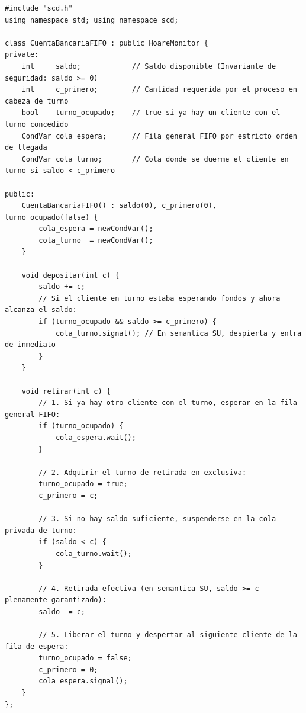 \documentclass[11pt,a4paper]{article}
\begin{document}
\begin{lstlisting}
#include "scd.h"
using namespace std; using namespace scd;

class CuentaBancariaFIFO : public HoareMonitor {
private:
    int     saldo;            // Saldo disponible (Invariante de seguridad: saldo >= 0)
    int     c_primero;        // Cantidad requerida por el proceso en cabeza de turno
    bool    turno_ocupado;    // true si ya hay un cliente con el turno concedido
    CondVar cola_espera;      // Fila general FIFO por estricto orden de llegada
    CondVar cola_turno;       // Cola donde se duerme el cliente en turno si saldo < c_primero

public:
    CuentaBancariaFIFO() : saldo(0), c_primero(0), turno_ocupado(false) {
        cola_espera = newCondVar();
        cola_turno  = newCondVar();
    }

    void depositar(int c) {
        saldo += c;
        // Si el cliente en turno estaba esperando fondos y ahora alcanza el saldo:
        if (turno_ocupado && saldo >= c_primero) {
            cola_turno.signal(); // En semantica SU, despierta y entra de inmediato
        }
    }

    void retirar(int c) {
        // 1. Si ya hay otro cliente con el turno, esperar en la fila general FIFO:
        if (turno_ocupado) {
            cola_espera.wait();
        }

        // 2. Adquirir el turno de retirada en exclusiva:
        turno_ocupado = true;
        c_primero = c;

        // 3. Si no hay saldo suficiente, suspenderse en la cola privada de turno:
        if (saldo < c) {
            cola_turno.wait();
        }

        // 4. Retirada efectiva (en semantica SU, saldo >= c plenamente garantizado):
        saldo -= c;

        // 5. Liberar el turno y despertar al siguiente cliente de la fila de espera:
        turno_ocupado = false;
        c_primero = 0;
        cola_espera.signal();
    }
};
\end{lstlisting}

\vspace{-0.15cm}
\end{document}
